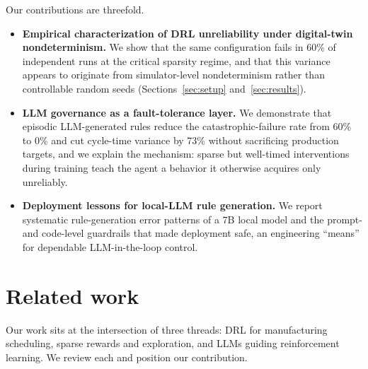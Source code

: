 \documentclass[10pt]{article}
\begin{document}
Our contributions are threefold.
\begin{itemize}
\setlength\itemsep{0em}
\item \textbf{Empirical characterization of DRL unreliability under digital-twin
nondeterminism.} We show that the same configuration fails in 60\% of
independent runs at the critical sparsity regime, and that this variance
appears to originate from simulator-level nondeterminism rather than controllable random seeds
(Sections~\ref{sec:setup} and~\ref{sec:results}).
\item \textbf{LLM governance as a fault-tolerance layer.} We demonstrate that
episodic LLM-generated rules reduce the catastrophic-failure rate from 60\%
to 0\% and cut cycle-time variance by 73\% without sacrificing production
targets, and we explain the mechanism: sparse but well-timed interventions during
training teach the agent a behavior it otherwise acquires only unreliably.
\item \textbf{Deployment lessons for local-LLM rule generation.} We report
systematic rule-generation error patterns of a 7B local model and the prompt-
and code-level guardrails that made deployment safe, an engineering ``means''
for dependable LLM-in-the-loop control.
\end{itemize}


\section{Related work}
\label{sec:related}

Our work sits at the intersection of three threads: DRL for manufacturing
scheduling, sparse rewards and exploration, and LLMs guiding reinforcement
learning. We review each and position our contribution.
\end{document}
